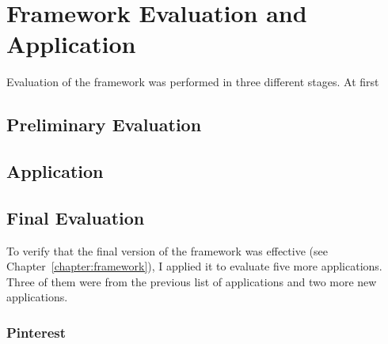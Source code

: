\chapter{Framework Evaluation and Application}
\label{chapter:application}

Evaluation of the framework was performed in three different stages. At first  


{\section{Preliminary Evaluation}






} %


{\section{Application}


} %



{\section{Final Evaluation}
To verify that the final version of the framework was effective (see Chapter~\ref{chapter:framework}), I applied it to evaluate five more applications. Three of them were from the previous list of applications and two more new applications. 
} %

{\subsection{Pinterest}

} %


